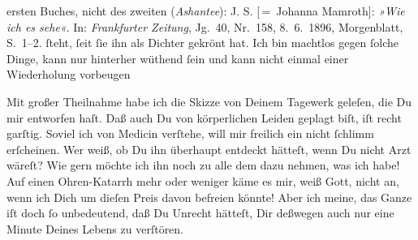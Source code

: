 {{{                  ersten Buches, nicht des
                  zweiten (\emph{Ashantee}): J. S. [ = Johanna Mamroth]: \emph{»Wie ich es sehe«}. In: \emph{Frankfurter Zeitung}, Jg. 40, Nr. 158, 8. 6. 1896,
                     Morgenblatt, S. 1–2. }}}\label{K_L02792-14}{ }ſteht,{ }ſeit{ }ſie ihn als Dichter gekrönt
               hat. Ich bin machtlos gegen{ }ſolche Dinge, kann nur hinterher wüthend{ }ſein und kann
               nicht einmal einer Wiederholung vorbeugen{\dotsfour}\pend
           
\pstart
           Mit großer Theilnahme habe ich die Skizze von Deinem Tagewerk geleſen, die Du mir
               entworfen haſt. Daß auch Du von körperlichen Leiden geplagt biſt, iſt recht garſtig.
               Soviel ich von Medicin verſtehe, will mir freilich ein \label{K_L02792-15v}\label{K_L02792-15} nicht{ }ſchlimm erſcheinen. Wer weiß, ob Du ihn
               überhaupt entdeckt hätteſt, {\pb}wenn Du nicht Arzt
               wäreſt? Wie gern möchte ich ihn noch zu alle dem dazu nehmen, was ich habe! Auf einen
               Ohren-Katarrh mehr oder weniger käme es mir, weiß Gott, nicht an, wenn ich Dich \strikeout{\textcolor{gray}{von}} um dieſen Preis davon befreien könnte! Aber ich meine, das Ganze iſt doch{ }ſo
               unbedeutend, daß Du Unrecht hätteſt, Dir deßwegen auch nur eine Minute Deines Lebens
               zu verſtören.\pend
           
